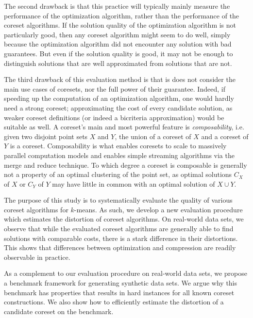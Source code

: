The second drawback is that this practice will typically mainly measure the performance of the optimization algorithm, rather than the performance of the coreset algorithms. If the solution quality of the optimization algorithm is not particularly good, then any coreset algorithm might seem to do well, simply because the optimization algorithm did not encounter any solution with bad guarantees. But even if the solution quality is good, it may not be enough to distinguish solutions that are well approximated from solutions that are not.


The third drawback of this evaluation method is that is does not consider the main use cases of coresets, nor the full power of their guarantee. Indeed, if speeding up the computation of an optimization algorithm, one would hardly need a strong coreset; approximating the cost of every candidate solution, as weaker coreset definitions (or indeed a bicriteria approximation) would be suitable as well. A coreset's main and most powerful feature is \emph{composability}, i.e. given two disjoint point sets $X$ and $Y$, the union of a coreset of $X$ and a coreset of $Y$ is a coreset. Composability is what enables coresets to scale to massively parallel computation models and enables simple streaming algorithms via the merge and reduce technique. To which degree a coreset is composable is generally not a property of an optimal clustering of the point set, as optimal solutions $C_X$ of $X$ or $C_Y$ of $Y$ may have little in common with an optimal solution of $X\cup Y$. 


The purpose of this study is to systematically evaluate the quality of various coreset algorithms for $k$-means. As such, we develop a new evaluation procedure which estimates the distortion of coreset algorithms. On real-world data sets, we observe that while the evaluated coreset algorithms are generally able to find solutions with comparable costs, there is a stark difference in their distortions. This shows that differences between optimization and compression are readily observable in practice.

As a complement to our evaluation procedure on real-world data sets, we propose a benchmark framework for generating synthetic data sets. We argue why this benchmark has properties that results in hard instances for all known coreset constructions. We also show how to efficiently estimate the distortion of a candidate coreset on the benchmark.


